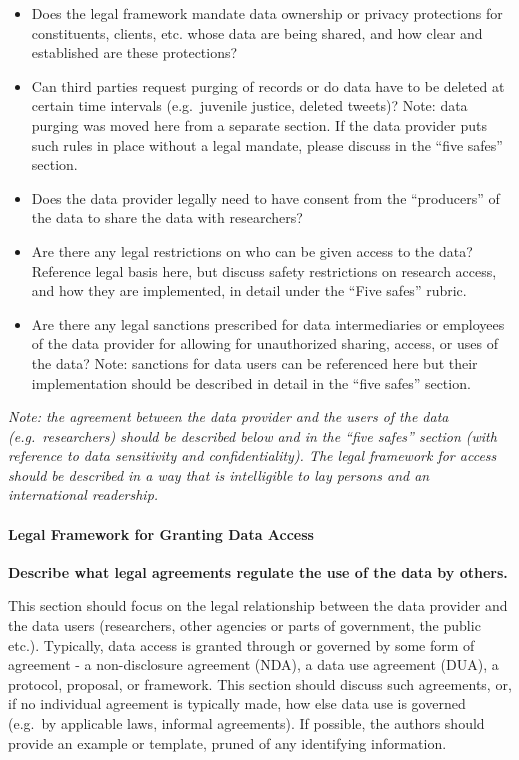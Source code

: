 \documentclass[
]{WileySix}
\providecommand{\tightlist}{%
  \setlength{\itemsep}{0pt}\setlength{\parskip}{0pt}}
\begin{document}
\begin{itemize}
\tightlist
\item
  Does the legal framework mandate data ownership or privacy protections for constituents, clients, etc. whose data are being shared, and how clear and established are these protections?
\item
  Can third parties request purging of records or do data have to be deleted at certain time intervals (e.g.~juvenile justice, deleted tweets)? Note: data purging was moved here from a separate section. If the data provider puts such rules in place without a legal mandate, please discuss in the ``five safes'' section.
\item
  Does the data provider legally need to have consent from the ``producers'' of the data to share the data with researchers?
\item
  Are there any legal restrictions on who can be given access to the data? Reference legal basis here, but discuss safety restrictions on research access, and how they are implemented, in detail under the ``Five safes'' rubric.
\item
  Are there any legal sanctions prescribed for data intermediaries or employees of the data provider for allowing for unauthorized sharing, access, or uses of the data? Note: sanctions for data users can be referenced here but their implementation should be described in detail in the ``five safes'' section.
\end{itemize}

\emph{Note: the agreement between the data provider and the users of the data (e.g.~researchers) should be described below and in the ``five safes'' section (with reference to data sensitivity and confidentiality). The legal framework for access should be described in a way that is intelligible to lay persons and an international readership.}

\hypertarget{legal-framework-for-granting-data-access-8}{%
\paragraph{Legal Framework for Granting Data Access}\label{legal-framework-for-granting-data-access-8}}

\textbf{Describe what legal agreements regulate the use of the data by others.}

This section should focus on the legal relationship between the data provider and the data users (researchers, other agencies or parts of government, the public etc.). Typically, data access is granted through or governed by some form of agreement - a non-disclosure agreement (NDA), a data use agreement (DUA), a protocol, proposal, or framework. This section should discuss such agreements, or, if no individual agreement is typically made, how else data use is governed (e.g.~by applicable laws, informal agreements). If possible, the authors should provide an example or template, pruned of any identifying information.
\end{document}
